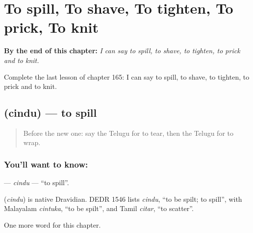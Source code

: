
\chapter{To spill, To shave, To tighten, To prick, To knit}
\label{ch:te-to-spill-to-shave-to-tighten-to-prick-to-knit}

\begin{chapteropening}
\textbf{By the end of this chapter:} \emph{I can say to spill, to shave, to tighten, to prick and to knit.}

Complete the last lesson of chapter 165: I can say to spill, to shave, to tighten, to prick and to knit.
\end{chapteropening}

\section[\texorpdfstring{\te{చిందు} (cindu)}{చిందు (cindu)}]{ (cindu) — to spill}

\label{lesson:TE-C165-cindu}



\begin{quote}
Before the new one: say the Telugu for to tear, then the Telugu for to wrap.
\end{quote}

\subsection*{You'll want to know: }
\textbf{} — \emph{cindu} — \textquotedblleft{}to spill\textquotedblright{}.

\begin{cousinweb}
\textbf{} (\emph{cindu}) is native Dravidian. DEDR 1546 lists \emph{cindu}, \textquotedblleft{}to be spilt; to spill\textquotedblright{}, with Malayalam \emph{cintuka}, \textquotedblleft{}to be spilt\textquotedblright{}, and Tamil \emph{citar}, \textquotedblleft{}to scatter\textquotedblright{}.
\end{cousinweb}

\begin{grammarlens}[title={What you've built}]
One more word for this chapter.
\end{grammarlens}

